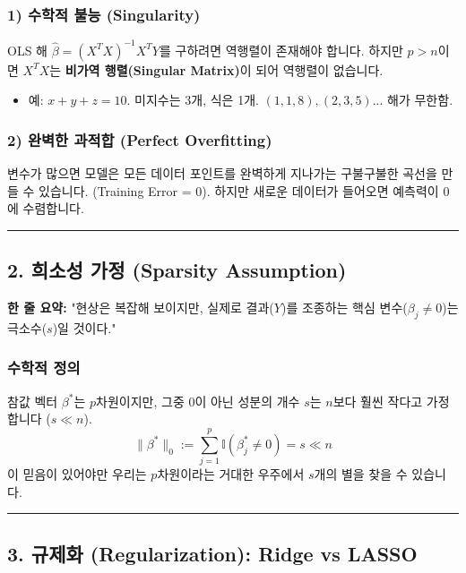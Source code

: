 \documentclass[11pt,a4paper]{book}
\theoremstyle{definition}
\begin{document}
\subsubsection*{1) 수학적 불능 (Singularity)}
OLS 해 $\hat{\beta} = (X^T X)^{-1} X^T Y$를 구하려면 역행렬이 존재해야 합니다.
하지만 $p > n$이면 $X^T X$는 \textbf{비가역 행렬(Singular Matrix)}이 되어 역행렬이 없습니다.
\begin{itemize}
    \item 예: $x + y + z = 10$. 미지수는 3개, 식은 1개. $(1,1,8), (2,3,5)...$ 해가 무한함.
\end{itemize}

\subsubsection*{2) 완벽한 과적합 (Perfect Overfitting)}
변수가 많으면 모델은 모든 데이터 포인트를 완벽하게 지나가는 구불구불한 곡선을 만들 수 있습니다. (Training Error = 0). 하지만 새로운 데이터가 들어오면 예측력이 0에 수렴합니다.

\vspace{0.5cm}\hrule\vspace{0.5cm}

\subsection{2. 희소성 가정 (Sparsity Assumption)}

\begin{conceptbox}[title={개념 2: 오컴의 면도날 (Occam's Razor)}]
\textbf{한 줄 요약:} "현상은 복잡해 보이지만, 실제로 결과($Y$)를 조종하는 핵심 변수($\beta_j \neq 0$)는 극소수($s$)일 것이다."
\end{conceptbox}

\subsubsection*{수학적 정의}
참값 벡터 $\beta^*$는 $p$차원이지만, 그중 0이 아닌 성분의 개수 $s$는 $n$보다 훨씬 작다고 가정합니다 ($s \ll n$).
$$ \|\beta^*\|_0 := \sum_{j=1}^p \mathbb{I}(\beta^*_j \neq 0) = s \ll n $$
이 믿음이 있어야만 우리는 $p$차원이라는 거대한 우주에서 $s$개의 별을 찾을 수 있습니다.

\vspace{0.5cm}\hrule\vspace{0.5cm}

\subsection{3. 규제화 (Regularization): Ridge vs LASSO}
\end{document}
